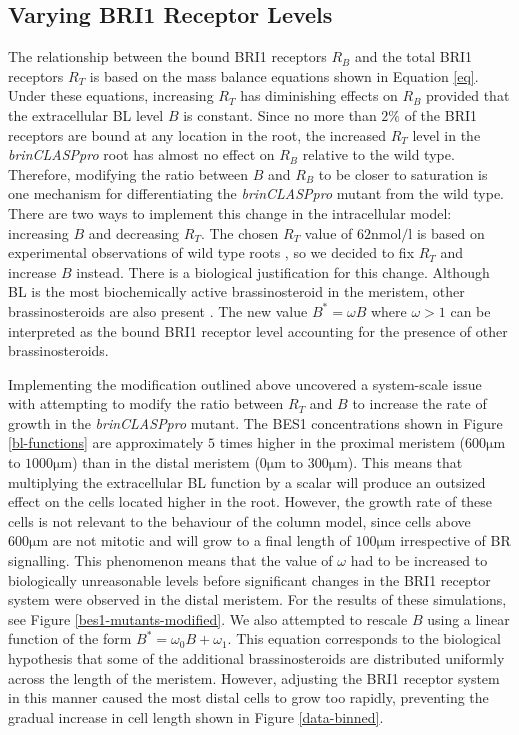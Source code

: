 \documentclass[referee,pdflatex,sn-mathphys-num]{sn-jnl}
\newcommand{\um}{\unit{\micro\metre}}
\newcommand{\nm}{\unit{\nano\mole\per\litre}}
\begin{document}
\subsection{Varying BRI1 Receptor Levels}

The relationship between the bound BRI1 receptors $R_{B}$ and the total BRI1 receptors $R_{T}$ is based on the mass balance equations shown in Equation \eqref{eq}. Under these equations, increasing $R_{T}$ has diminishing effects on $R_{B}$ provided that the extracellular BL level $B$ is constant. Since no more than $2\%$ of the BRI1 receptors are bound at any location in the root, the increased $R_{T}$ level in the \emph{brinCLASPpro} root has almost no effect on $R_{B}$ relative to the wild type. Therefore, modifying the ratio between $B$ and $R_{B}$ to be closer to saturation is one mechanism for differentiating the \emph{brinCLASPpro} mutant from the wild type. There are two ways to implement this change in the intracellular model: increasing $B$ and decreasing $R_{T}$. The chosen $R_{T}$ value of $62\nm$ is based on experimental observations of wild type roots \cite{vanesse2011}, so we decided to fix $R_{T}$ and increase $B$ instead. There is a biological justification for this change. Although BL is the most biochemically active brassinosteroid in the meristem, other brassinosteroids are also present \cite{vukasinovic2021, ackerman-lavert2020}. The new value $B^{*} = \omega B$ where $\omega > 1$ can be interpreted as the bound BRI1 receptor level accounting for the presence of other brassinosteroids. 

Implementing the modification outlined above uncovered a system-scale issue with attempting to modify the ratio between $R_{T}$ and $B$ to increase the rate of growth in the \emph{brinCLASPpro} mutant. The BES1 concentrations shown in Figure \ref{bl-functions} are approximately $5$ times higher in the proximal meristem ($600\um$ to $1000\um$) than in the distal meristem ($0\um$ to $300\um$). This means that multiplying the extracellular BL function by a scalar will produce an outsized effect on the cells located higher in the root. However, the growth rate of these cells is not relevant to the behaviour of the column model, since cells above $600\um$ are not mitotic and will grow to a final length of $100\um$ irrespective of BR signalling. This phenomenon means that the value of $\omega$ had to be increased to biologically unreasonable levels before significant changes in the BRI1 receptor system were observed in the distal meristem. For the results of these simulations, see Figure \ref{bes1-mutants-modified}. We also attempted to rescale $B$ using a linear function of the form $B^{*} = \omega_{0}B + \omega_{1}$. This equation corresponds to the biological hypothesis that some of the additional brassinosteroids are distributed uniformly across the length of the meristem. However, adjusting the BRI1 receptor system in this manner caused the most distal cells to grow too rapidly, preventing the gradual increase in cell length shown in Figure \ref{data-binned}.
 
\end{document}
